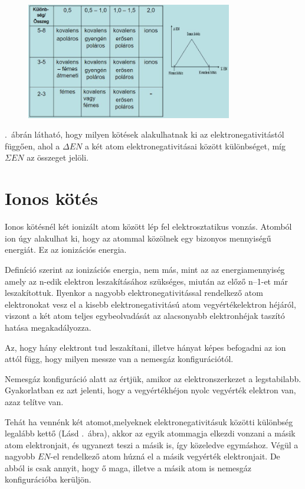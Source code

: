 \documentclass[colorlinks]{thesis-ekf}
\theoremstyle{definition}
\theoremstyle{remark}
\begin{document}
\begin{figure}[!ht]
	\centering
	\includegraphics[width=9cm]{en_slide}
	\caption{\cite[52.~ppt]{periodusos_ppt}}\label{EN_tablazat}
\end{figure}
.~ábrán látható, hogy milyen kötések alakulhatnak ki az elektronegativitástól függően, ahol a \begin{math}\Delta EN\end{math} a két atom elektronegativitásai között különbséget, míg \begin{math}\Sigma EN\end{math} az összeget jelöli.\cite{eke_kemia_ppt}
\section{Ionos kötés}

Ionos kötésnél két ionizált atom között lép fel elektrosztatikus vonzás.
Atomból ion úgy alakulhat ki, hogy az atommal közölnek egy bizonyos mennyiségű energiát. Ez az ionizációs energia. 

Definíció szerint az ionizációs energia, nem más, mint az az energiamennyiség  amely az n-edik elektron leszakításához szükséges, miután az előző n–1-et már leszakítottuk.\cite{miskolc_kemia}
Ilyenkor a nagyobb elektronegativitással rendelkező atom elektronokat vesz el a kisebb elektronegativitású atom vegyértékelektron héjáról, viszont a két atom teljes egybeolvadását az alacsonyabb elektronhéjak taszító hatása megakadályozza.\cite{miskolc_kemia}

Az, hogy hány elektront tud leszakítani, illetve hányat képes befogadni az ion attól függ, hogy milyen messze van a nemesgáz konfigurációtól.

Nemesgáz konfiguráció alatt az értjük, amikor az elektronszerkezet a legstabilabb. Gyakorlatban ez azt jelenti, hogy a vegyértékhéjon nyolc vegyérték elektron van, azaz telítve van.\cite{ionos_vidi}

Tehát ha vennénk két atomot,melyeknek elektronegativitásuk közötti különbség legalább kettő (Lásd .~ábra), akkor az egyik atommagja elkezdi vonzani a másik atom elektronjait, és ugyanezt teszi a másik is, így közeledve egymáshoz. Végül a nagyobb \begin{math} EN\end{math}-el rendelkező atom húzná el a másik vegyérték elektronjait. De abból is csak annyit, hogy ő maga, illetve a másik atom is nemesgáz konfigurációba kerüljön. \cite{ionos_vidi}
\end{document}
